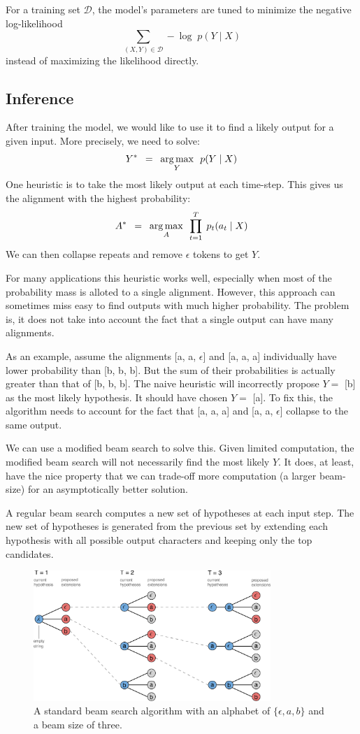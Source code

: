 For a training set $\mathcal{D}$, the model's parameters are tuned to minimize
the negative log-likelihood
\[
\sum_{(X, Y) \in \mathcal{D}} -\log\; p(Y \mid X)
\]
instead of maximizing the likelihood directly.

\subsection{Inference}

After training the model, we would like to use it to find a likely output for a
given input. More precisely, we need to solve:
\[
Y^* \enspace = \enspace \operatorname*{arg\,max}_Y \enspace p(Y \mid X)
\]
One heuristic is to take the most likely output at each time-step. This gives
us the alignment with the highest probability:
\[
A^* \enspace = \enspace \operatorname*{arg\,max}_A \enspace  \prod_{t=1}^{T} \; p_t(a_t \mid X)
\]
We can then collapse repeats and remove $\epsilon$ tokens to get $Y$.

For many applications this heuristic works well, especially when most of the
probability mass is alloted to a single alignment. However, this approach can
sometimes miss easy to find outputs with much higher probability. The problem
is, it does not take into account the fact that a single output can have many
alignments.

As an example, assume the alignments [a, a, $\epsilon$] and [a, a, a]
individually have lower probability than [b, b, b]. But the sum of their
probabilities is actually greater than that of [b, b, b]. The naive heuristic
will incorrectly propose $Y =$ [b] as the most likely hypothesis. It should
have chosen $Y =$ [a].  To fix this, the algorithm needs to account for the
fact that [a, a, a] and [a, a, $\epsilon$] collapse to the same output.

We can use a modified beam search to solve this. Given limited computation, the
modified beam search will not necessarily find the most likely $Y$. It does, at
least, have the nice property that we can trade-off more computation (a larger
beam-size) for an asymptotically better solution.

A regular beam search computes a new set of hypotheses at each input step. The
new set of hypotheses is generated from the previous set by extending each
hypothesis with all possible output characters and keeping only the top
candidates.

\begin{figure}
\centering
\includegraphics[width=0.8\textwidth]{background/figures/beam_search.pdf}
\caption{A standard beam search algorithm with an alphabet of $\{\epsilon, a,
    b\}$ and a beam size of three.}
\end{figure}

